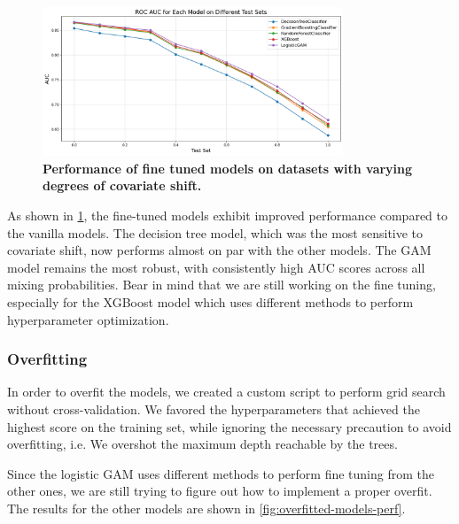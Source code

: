 \begin{figure}[H]
    \centering
    \includegraphics[width=0.8\textwidth]{assets/tuned.png} 
    \caption{\textbf{Performance of fine tuned models on datasets with varying degrees of covariate shift.}}
    \label{fig:tuned-models-perf}
\end{figure}

As shown in \cref{fig:tuned-models-perf}, the fine-tuned models exhibit improved performance compared to the vanilla models. The decision tree model, which was the most sensitive to covariate shift, now performs almost on par with the other models. The GAM model remains the most robust, with consistently high AUC scores across all mixing probabilities.
Bear in mind that we are still working on the fine tuning, especially for the XGBoost model which uses different methods to perform hyperparameter optimization.

\subsubsection{Overfitting}


In order to overfit the models, we created a custom script to perform grid search without cross-validation. We favored the hyperparameters that achieved the highest score on the training set, while ignoring the necessary precaution to avoid overfitting, i.e. We overshot the maximum depth reachable by the trees.

Since the logistic GAM uses different methods to perform fine tuning from the other ones, we are still trying to figure out how to implement a proper overfit. The results for the other models are shown in \cref{fig:overfitted-models-perf}.

